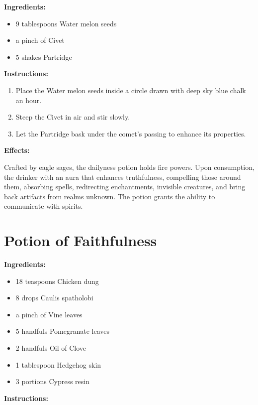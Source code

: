 \documentclass{article}
\begin{document}
\textbf{Ingredients:}

\begin{itemize}
  \item 9 tablespoons Water melon seeds
  \item a pinch of Civet
  \item 5 shakes Partridge
\end{itemize}

\textbf{Instructions:}

\begin{enumerate}
  \item Place the Water melon seeds inside a circle drawn with deep sky blue chalk an hour.
  \item Steep the Civet in air and stir slowly.
  \item Let the Partridge bask under the comet’s passing to enhance its properties.
\end{enumerate}

\textbf{Effects:}

Crafted by eagle sages, the dailyness potion holds fire powers. Upon consumption, the drinker with an aura that enhances truthfulness, compelling those around them, absorbing spells, redirecting enchantments, invisible creatures, and bring back artifacts from realms unknown. The potion grants the ability to communicate with spirits.

\newpage
\section*{Potion of Faithfulness}

\textbf{Ingredients:}

\begin{itemize}
  \item 18 teaspoons Chicken dung
  \item 8 drops Caulis spatholobi
  \item a pinch of Vine leaves
  \item 5 handfuls Pomegranate leaves
  \item 2 handfuls Oil of Clove
  \item 1 tablespoon Hedgehog skin
  \item 3 portions Cypress resin
\end{itemize}

\textbf{Instructions:}
\end{document}
